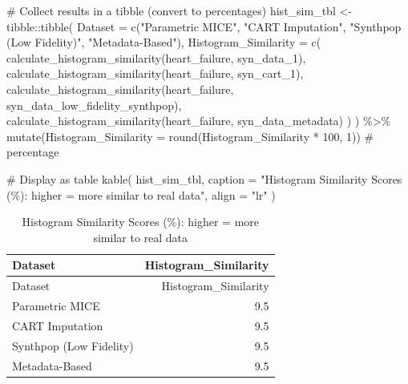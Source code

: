\documentclass[
  letterpaper,
  DIV=11,
  numbers=noendperiod]{scrartcl}
\newenvironment{Shaded}{\begin{snugshade}}{\end{snugshade}}
\newcommand{\AttributeTok}[1]{\textcolor[rgb]{0.40,0.45,0.13}{#1}}
\newcommand{\CommentTok}[1]{\textcolor[rgb]{0.37,0.37,0.37}{#1}}
\newcommand{\DecValTok}[1]{\textcolor[rgb]{0.68,0.00,0.00}{#1}}
\newcommand{\FunctionTok}[1]{\textcolor[rgb]{0.28,0.35,0.67}{#1}}
\newcommand{\NormalTok}[1]{\textcolor[rgb]{0.00,0.23,0.31}{#1}}
\newcommand{\OtherTok}[1]{\textcolor[rgb]{0.00,0.23,0.31}{#1}}
\newcommand{\SpecialCharTok}[1]{\textcolor[rgb]{0.37,0.37,0.37}{#1}}
\newcommand{\StringTok}[1]{\textcolor[rgb]{0.13,0.47,0.30}{#1}}
\begin{document}
\begin{Shaded}
\begin{Highlighting}[]
\CommentTok{\# Collect results in a tibble (convert to percentages)}
\NormalTok{hist\_sim\_tbl }\OtherTok{\textless{}{-}}\NormalTok{ tibble}\SpecialCharTok{::}\FunctionTok{tibble}\NormalTok{(}
  \AttributeTok{Dataset =} \FunctionTok{c}\NormalTok{(}\StringTok{"Parametric MICE"}\NormalTok{, }\StringTok{"CART Imputation"}\NormalTok{, }\StringTok{"Synthpop (Low Fidelity)"}\NormalTok{, }\StringTok{"Metadata{-}Based"}\NormalTok{),}
  \AttributeTok{Histogram\_Similarity =} \FunctionTok{c}\NormalTok{(}
    \FunctionTok{calculate\_histogram\_similarity}\NormalTok{(heart\_failure, syn\_data\_1),}
    \FunctionTok{calculate\_histogram\_similarity}\NormalTok{(heart\_failure, syn\_cart\_1),}
    \FunctionTok{calculate\_histogram\_similarity}\NormalTok{(heart\_failure, syn\_data\_low\_fidelity\_synthpop),}
    \FunctionTok{calculate\_histogram\_similarity}\NormalTok{(heart\_failure, syn\_data\_metadata)}
\NormalTok{  )}
\NormalTok{) }\SpecialCharTok{\%\textgreater{}\%}
  \FunctionTok{mutate}\NormalTok{(}\AttributeTok{Histogram\_Similarity =} \FunctionTok{round}\NormalTok{(Histogram\_Similarity }\SpecialCharTok{*} \DecValTok{100}\NormalTok{, }\DecValTok{1}\NormalTok{))  }\CommentTok{\# percentage}

\CommentTok{\# Display as table}
\FunctionTok{kable}\NormalTok{(}
\NormalTok{  hist\_sim\_tbl,}
  \AttributeTok{caption =} \StringTok{"Histogram Similarity Scores (\%): higher = more similar to real data"}\NormalTok{,}
  \AttributeTok{align =} \StringTok{"lr"}
\NormalTok{)}
\end{Highlighting}
\end{Shaded}

\begin{longtable}[]{@{}lr@{}}
\caption{Histogram Similarity Scores (\%): higher = more similar to real
data}\tabularnewline
\toprule\noalign{}
Dataset & Histogram\_Similarity \\
\midrule\noalign{}
\endfirsthead
\toprule\noalign{}
Dataset & Histogram\_Similarity \\
\midrule\noalign{}
\endhead
\bottomrule\noalign{}
\endlastfoot
Parametric MICE & 9.5 \\
CART Imputation & 9.5 \\
Synthpop (Low Fidelity) & 9.5 \\
Metadata-Based & 9.5 \\
\end{longtable}
\end{document}
